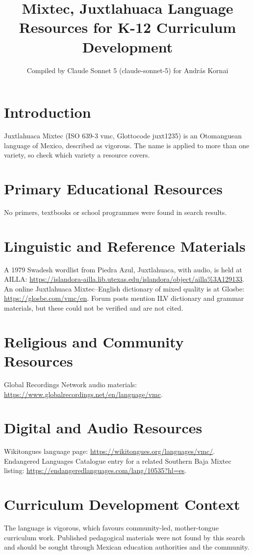 \documentclass[12pt]{article}
\title{Mixtec, Juxtlahuaca Language Resources for K-12 Curriculum Development}
\author{Compiled by Claude Sonnet 5 (claude-sonnet-5) for Andr\'as Kornai}
\date{}
\begin{document}
\maketitle
\section{Introduction}
Juxtlahuaca Mixtec (ISO 639-3 vmc, Glottocode juxt1235) is an Otomanguean language of Mexico, described as vigorous. The name is applied to more than one variety, so check which variety a resource covers.
\section{Primary Educational Resources}
No primers, textbooks or school programmes were found in search results.
\section{Linguistic and Reference Materials}
A 1979 Swadesh wordlist from Piedra Azul, Juxtlahuaca, with audio, is held at AILLA: \url{https://islandora-ailla.lib.utexas.edu/islandora/object/ailla%3A129133}. An online Juxtlahuaca Mixtec--English dictionary of mixed quality is at Glosbe: \url{https://glosbe.com/vmc/en}. Forum posts mention ILV dictionary and grammar materials, but these could not be verified and are not cited.
\section{Religious and Community Resources}
Global Recordings Network audio materials: \url{https://www.globalrecordings.net/en/language/vmc}.
\section{Digital and Audio Resources}
Wikitongues language page: \url{https://wikitongues.org/languages/vmc/}. Endangered Languages Catalogue entry for a related Southern Baja Mixtec listing: \url{https://endangeredlanguages.com/lang/10535?hl=es}.
\section{Curriculum Development Context}
The language is vigorous, which favours community-led, mother-tongue curriculum work. Published pedagogical materials were not found by this search and should be sought through Mexican education authorities and the community.
\end{document}
